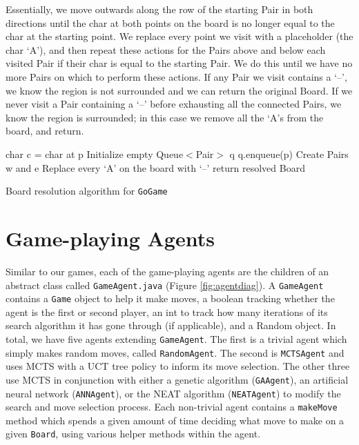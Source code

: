 Essentially, we move outwards along the row of the starting Pair in both directions until the char at both points on the board is no longer equal to the char at the starting point.  We replace every point we visit with a placeholder (the char `A'), and then repeat these actions for the Pairs above and below each visited Pair if their char is equal to the starting Pair.  We do this until we have no more Pairs on which to perform these actions.  If any Pair we visit contains a `--', we know the region is not surrounded and we can return the original Board.  If we never visit a Pair containing a `--' before exhausting all the connected Pairs, we know the region is surrounded; in this case we remove all the `A's from the board, and return.

\begin{algorithm}[htbp]
 \SetAlgoLined %
 
 char c = char at p\;
 Initialize empty Queue$<$Pair$>$ q\;
 q.enqueue(p)\;
 Create Pairs w and e\;
 Replace every `A' on the board with `--'\;
 return resolved Board\;
 \caption{Board resolution algorithm for \texttt{GoGame}}
\label{fig:resolve}
\end{algorithm}

\section{Game-playing Agents}
Similar to our games, each of the game-playing agents are the children of an abstract class called \texttt{GameAgent.java} (Figure \ref{fig:agentdiag}).  A \texttt{GameAgent} contains a \texttt{Game} object to help it make moves, a boolean tracking whether the agent is the first or second player, an int to track how many iterations of its search algorithm it has gone through (if applicable), and a Random object.  In total, we have five agents extending \texttt{GameAgent}.  The first is a trivial agent which simply makes random moves, called \texttt{RandomAgent}.  The second is \texttt{MCTSAgent} and uses MCTS with a UCT tree policy to inform its move selection.  The other three use MCTS in conjunction with either a genetic algorithm (\texttt{GAAgent}), an artificial neural network (\texttt{ANNAgent}), or the NEAT algorithm (\texttt{NEATAgent}) to modify the search and move selection process.  Each non-trivial agent contains a \texttt{makeMove} method which spends a given amount of time deciding what move to make on a given \texttt{Board}, using various helper methods within the agent.

